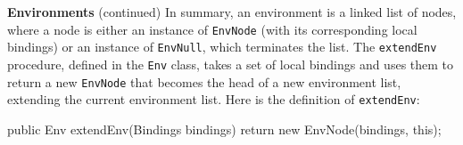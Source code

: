 \begin{minipage}[t]{\sw}
\slidenumber
\LARGE
{\bf Environments} (continued)\exx
In summary, an environment is a linked list of nodes,
where a node is either an instance of \verb'EnvNode'
(with its corresponding local bindings)
or an instance of \verb'EnvNull',
which terminates the list.\exx
The \verb'extendEnv' procedure, defined in the \verb'Env' class,
takes a set of local bindings and uses them
to return a new \verb'EnvNode'
that becomes the head of a new environment list,
extending the current environment list.
Here is the definition of \verb'extendEnv':
{\Large
\begin{qv}
public Env extendEnv(Bindings bindings) {
    return new EnvNode(bindings, this);
}
\end{qv}
}
\end{minipage}
\clearpage
